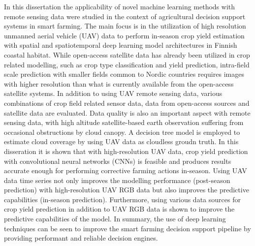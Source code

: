 In this dissertation the applicability of novel machine learning methods with remote sensing data were studied in the context of agricultural decision support systems in smart farming. The main focus is in the utilization of high resolution unmanned aerial vehicle (UAV) data to perform in-season crop yield estimation with spatial and spatiotemporal deep learning model architectures in Finnish coastal habitat. While open-access satellite data has already been utilized in crop related modelling, such as crop type classification and yield prediction, intra-field scale prediction with smaller fields common to Nordic countries requires images with higher resolution than what is currently available from the open-access satellite systems. In addition to using UAV remote sensing data, various combinations of crop field related sensor data, data from open-access sources and satellite data are evaluated. Data quality is also an important aspect with remote sensing data, with high altitude satellite-based earth observation suffering from occasional obstructions by cloud canopy. A decision tree model is employed to estimate cloud coverage by using UAV data as cloudless groudn truth. In this disseration it is shown that with high-resolution UAV data, crop yield prediction with convolutional neural networks (CNNs) is feasible and produces results accurate enough for performing corrective farming actions in-season. Using UAV data time series not only improves the modelling performance (post-season prediction) with high-resolution UAV RGB data but also improves the predictive capabilities (in-season prediction). Furthermore, using various data sources for crop yield prediction in addition to UAV RGB data is shown to improve the predictive capabilities of the model. In summary, the use of deep learning techniques can be seen to improve the smart farming decision support pipeline by providing performant and reliable decision engines.